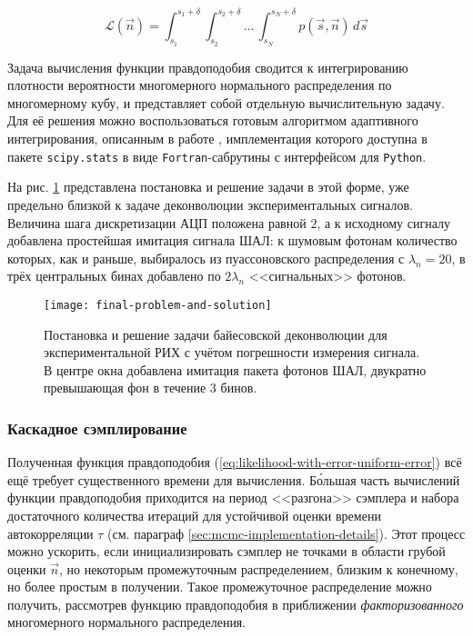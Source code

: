 \begin{equation}
	\label{eq:likelihood-with-error-uniform-error}
	\mathcal{L}(\vec{n}) = \int_{s_1}^{s_1 + \delta} \int_{s_2}^{s_2 + \delta} \ldots \, \int_{s_{N}}^{s_N + \delta} p(\vec{s}, \vec{n}) \, d\vec{s}
\end{equation}

Задача вычисления функции правдоподобия сводится к интегрированию плотности вероятности многомерного нормального распределения по многомерному кубу, и представляет собой отдельную вычислительную задачу. Для её решения можно воспользоваться готовым алгоритмом адаптивного интегрирования, описанным в работе \cite{Genz1992}, имплементация которого доступна в пакете \verb|scipy.stats| \cite{2020SciPy-NMeth} в виде \verb|Fortran|-сабрутины с интерфейсом для \verb|Python|.

На рис. \ref{pic:bayesian-deconvolution-with-experimantal-rir-and-rounding} представлена постановка и решение задачи в этой форме, уже предельно близкой к задаче деконволюции экспериментальных сигналов. Величина шага дискретизации АЦП положена равной $2$, а к исходному сигналу добавлена простейшая имитация сигнала ШАЛ: к шумовым фотонам количество которых, как и раньше, выбиралось из пуассоновского распределения с $\lambda_n = 20$, в трёх центральных бинах добавлено по $2\lambda_n$ <<сигнальных>> фотонов.

\begin{figure}
	\centering
	\texttt{[image: final-problem-and-solution]}
	\caption{Постановка и решение задачи байесовской деконволюции для экспериментальной РИХ с учётом погрешности измерения сигнала. В центре окна добавлена имитация пакета фотонов ШАЛ, двукратно превышающая фон в течение 3 бинов.}
	\label{pic:bayesian-deconvolution-with-experimantal-rir-and-rounding}
\end{figure}

\subsubsection{Каскадное сэмплирование}

Полученная функция правдоподобия (\ref{eq:likelihood-with-error-uniform-error}) всё ещё требует существенного времени для вычисления. Б\'{о}льшая часть вычислений функции правдоподобия приходится на период <<разгона>> сэмплера и набора достаточного количества итераций для устойчивой оценки времени автокорреляции $\tau$ (см. параграф \ref{sec:mcmc-implementation-details}). Этот процесс можно ускорить, если инициализировать сэмплер не точками в области грубой оценки $\vec{n}$, но некоторым промежуточным распределением, близким к конечному, но более простым в получении. Такое промежуточное распределение можно получить, рассмотрев функцию правдоподобия в приближении \textit{факторизованного} многомерного нормального распределения.

